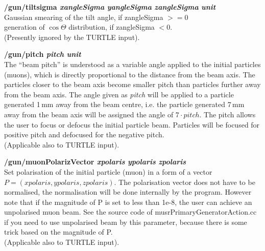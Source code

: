 \documentclass[twoside]{dis04}
\begin{document}
\begin{description}
\item{\bf /gun/tiltsigma \emph{xangleSigma} \emph{yangleSigma} \emph{zangleSigma} \emph{unit}}\\
	Gaussian smearing of the tilt angle, if zangleSigma $>= 0$\\
	generation of $\cos\Theta$ distribution, if zangleSigma $< 0$.\\
	(Presently ignored by the TURTLE input).

\item{\bf /gun/pitch \emph{pitch} \emph{unit}}\\
	The ``beam pitch'' is understood as a variable angle applied to the initial particles
        (muons), which is directly proportional to the distance from the beam axis.
	The particles closer to the beam axis become smaller pitch than particles further away
	from the beam axis.  
	The angle given as \emph{pitch} will be applied to a particle generated 1\,mm away from the
	beam centre, i.e. the particle generated 7\,mm away from the beam axis will be assigned
        the angle of $7\cdot pitch$.
	The pitch allows the user to focus or defocus the initial particle
	beam. Particles will be focused for positive pitch and defocused for the negative pitch.\\
	(Applicable also to TURTLE input).

\item{\bf /gun/muonPolarizVector \emph{xpolaris} \emph{ypolaris} \emph{zpolaris}}\\
	Set polarisation of the initial particle (muon) in a form of a vector 
	$P=(xpolaris,ypolaris,zpolaris)$.  The polarisation vector does not have to be normalised,
	the normalisation will be done internally by the program.
	However note that if the magnitude of P is set to less than 1e-8, the user can 
	achieve an unpolarised muon beam.  See the source code of musrPrimaryGeneratorAction.cc
	if you need to use unpolarised beam by this parameter, because there is some trick
        based on the magnitude of P.\\
	(Applicable also to TURTLE input).


\end{description}
\end{document}

